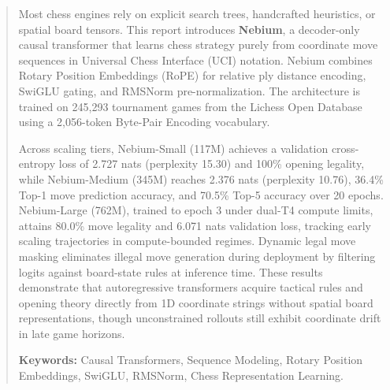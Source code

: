\begin{abstract}
\noindent
Most chess engines rely on explicit search trees, handcrafted heuristics, or spatial board tensors. This report introduces \textbf{Nebium}, a decoder-only causal transformer that learns chess strategy purely from coordinate move sequences in Universal Chess Interface (UCI) notation. Nebium combines Rotary Position Embeddings (RoPE) for relative ply distance encoding, SwiGLU gating, and RMSNorm pre-normalization. The architecture is trained on 245,293 tournament games from the Lichess Open Database using a 2,056-token Byte-Pair Encoding vocabulary.

Across scaling tiers, Nebium-Small (117M) achieves a validation cross-entropy loss of 2.727 nats (perplexity 15.30) and 100\% opening legality, while Nebium-Medium (345M) reaches 2.376 nats (perplexity 10.76), 36.4\% Top-1 move prediction accuracy, and 70.5\% Top-5 accuracy over 20 epochs. Nebium-Large (762M), trained to epoch 3 under dual-T4 compute limits, attains 80.0\% move legality and 6.071 nats validation loss, tracking early scaling trajectories in compute-bounded regimes. Dynamic legal move masking eliminates illegal move generation during deployment by filtering logits against board-state rules at inference time. These results demonstrate that autoregressive transformers acquire tactical rules and opening theory directly from 1D coordinate strings without spatial board representations, though unconstrained rollouts still exhibit coordinate drift in late game horizons.

\vspace{0.8em}
\noindent\textbf{Keywords:} Causal Transformers, Sequence Modeling, Rotary Position Embeddings, SwiGLU, RMSNorm, Chess Representation Learning.
\end{abstract}

